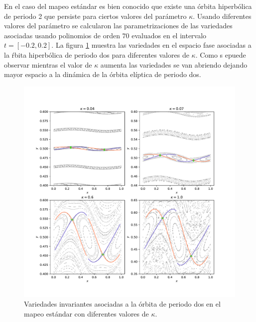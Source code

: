 En el caso del mapeo est\'andar es bien conocido que existe una \'orbita hiperb\'olica de periodo 2 que persiste para ciertos valores del par\'ametro $\kappa$. Usando diferentes valores del par\'ametro se calcularon las parametrizaciones de las variedades asociadas usando polinomios de orden $70$ evaluados en el intervalo $t=[-0.2,0.2]$. La figura \ref{estandarvariedadesperiodo2} muestra las variedades en el espacio fase asociadas a la \'rbita hiperb\'olica de periodo dos para diferentes valores de $\kappa$. Como s epuede observar mientras el valor de $\kappa$ aumenta las variedades se van abriendo dejando mayor espacio a la din\'amica de la \'orbita el\'iptica de periodo dos. \\



\begin{figure}
	\centering
	\includegraphics[scale=0.6]{variedadesestandarperiodo2}
	\caption{Variedades invariantes asociadas a la \'orbita de periodo dos en el mapeo est\'andar con diferentes valores de $\kappa$.}
	\label{estandarvariedadesperiodo2}
\end{figure}
